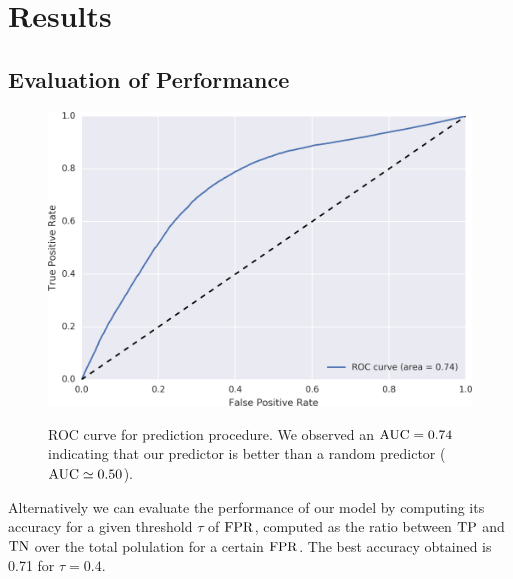 \section{Results}

\subsection{Evaluation of Performance}

\begin{figure}[h]
\begin{center}
{\includegraphics[width=0.9\columnwidth]
{figures/ROC_BETA/ROC_Beta_based_approach_201504.png}}
\caption{ROC curve for prediction procedure. We observed an \( \operatorname{AUC} = 0.74 \) indicating that our predictor is better than a random predictor (\( \operatorname{AUC} \simeq 0.50 \)).}
\label{ROC_multiclass}
\end{center}
\end{figure}

Alternatively we can evaluate the performance of our model by computing its accuracy for a given threshold \(\tau\) of \(\operatorname{FPR}\), computed as the ratio between \(\operatorname{TP}\) and \(\operatorname{TN}\) over the total polulation for a certain \(\operatorname{FPR}\). The best accuracy obtained is \num{0.71} for \( \tau = 0.4 \).
